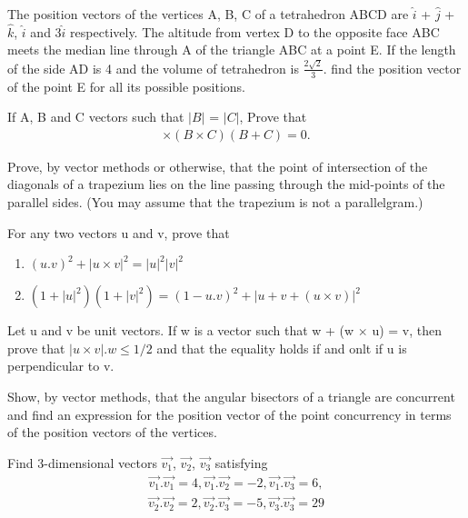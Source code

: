 \item The position vectors of the vertices A, B, C of a tetrahedron ABCD are $\hat{i}$ + $\hat{j}$ + $\hat{k}$, $\hat{i}$ and 3$\hat{i}$ respectively. The altitude from vertex D to the opposite face ABC meets the median line through A of the triangle ABC at a point E. If the length of the side AD is 4 and the volume of tetrahedron is $\frac{2\sqrt{2}}{3}$. find the position vector of the point E for all its possible positions.

\item If A, B and C vectors such that $|B|$ = $|C|$, Prove that
\begin{align*}
[(A+B) \times (A+C)] \times (B \times C)(B + C) = 0.
\end{align*}

\item Prove, by vector methods or otherwise, that the point of intersection of the diagonals of a trapezium lies on the line passing through the mid-points of the parallel sides. (You may assume that the trapezium is not a parallelgram.)

\item For any two vectors u and v, prove that
\begin{enumerate}
\item $(u.v)^{2} + |u \times v|^{2} = |u|^{2}|v|^{2}$
\item $(1 + |u|^{2})(1 + |v|^{2}) = (1 - u.v)^{2} + |u + v + (u \times v)|^{2}$
\end{enumerate}

\item Let u and v be unit vectors. If w is a vector such that w + (w $\times$ u) = v, then prove that $|u \times v|.w \leq 1/2$ and that the equality holds if and onlt if u is perpendicular to v.

\item Show, by vector methods, that the angular bisectors of a triangle are concurrent and find an expression for the position vector of the point concurrency in terms of the position vectors of the vertices.

\item Find 3-dimensional vectors $\overrightarrow{v_1}$, $\overrightarrow{v_2}$, $\overrightarrow{v_3}$ satisfying
\begin{align*}
\overrightarrow{v_1}.\overrightarrow{v_1} = 4, \overrightarrow{v_1}.\overrightarrow{v_2} = -2, \overrightarrow{v_1}.\overrightarrow{v_3} = 6, 
\end{align*}
\begin{align*}
\overrightarrow{v_2}.\overrightarrow{v_2} = 2, \overrightarrow{v_2}.\overrightarrow{v_3} = -5, \overrightarrow{v_3}.\overrightarrow{v_3} = 29
\end{align*}

